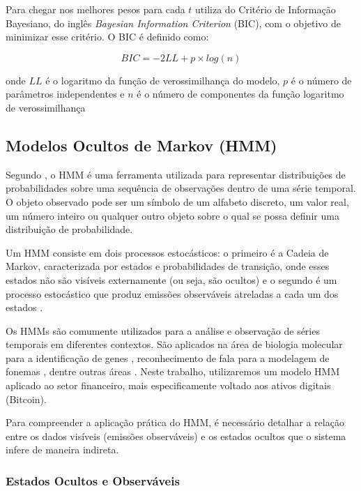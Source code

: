 \documentclass[
    12pt,                %
    openright,           %
    oneside,             %
    a4paper,             %
    english,             %
    brazil               %
]{abntex2}
\begin{document}
Para chegar nos melhores pesos para cada $t$  utiliza do Critério de Informação Bayesiano, do inglês \textit{Bayesian Information Criterion} 
(BIC), com o objetivo de minimizar esse critério. O BIC é definido como:

\begin{equation}
    BIC = -2LL + p \times log(n)    
\end{equation}

onde $LL$ é o logaritmo da função de verossimilhança do modelo, $p$ é o número de parâmetros independentes e $n$ é o número de componentes da função logaritmo de 
verossimilhança \cite{RAFTERY1985}

\subsection{Modelos Ocultos de Markov (HMM)}

Segundo , o HMM é uma ferramenta utilizada para representar
distribuições de probabilidades sobre uma sequência de observações dentro de uma série temporal. 
O objeto observado pode ser um símbolo de um alfabeto discreto, um valor real, um número inteiro ou qualquer 
outro objeto sobre o qual se possa definir uma distribuição de probabilidade.

Um HMM consiste em dois processos estocásticos: o primeiro é a Cadeia de Markov, caracterizada por estados e 
probabilidades de transição, onde esses estados não são visíveis externamente (ou seja, são ocultos) e o segundo é um 
processo estocástico que produz emissões observáveis atreladas a cada um dos estados \cite{Dymarski}.

Os HMMs são comumente utilizados para a análise e observação de séries temporais em diferentes contextos. São aplicados na área de biologia molecular para a 
identificação de genes \cite{MA2026101729}, reconhecimento de fala para a modelagem de fonemas \cite{jm3}, dentre outras áreas \cite{Dymarski}. Neste trabalho, 
utilizaremos um modelo HMM aplicado ao setor financeiro, mais especificamente voltado aos ativos digitais (Bitcoin).

Para compreender a aplicação prática do HMM, é necessário detalhar a relação entre os dados visíveis (emissões observáveis)
e os estados ocultos que o sistema infere de maneira indireta.
\subsubsection{Estados Ocultos e Observáveis}
\end{document}
